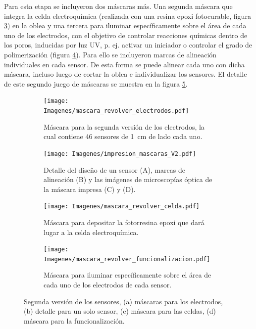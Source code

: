 {		     Para esta etapa se incluyeron dos máscaras más. Una segunda máscara que integra la celda electroquímica (realizada con una resina epoxi fotocurable, figura \ref{fig:mascara_su8}) en la oblea y una tercera para iluminar específicamente sobre el área de cada uno de los electrodos, con el objetivo de controlar reacciones químicas dentro de los poros, inducidas por luz UV, p. ej. activar un iniciador o controlar el grado de polimerización  (figura \ref{fig:mascara_funcionalizacion}).\cite{Andrieu-Brunsen2015,Herzog2015,Silies2015} Para ello se incluyeron marcas de alineación individuales en cada sensor. De esta forma se puede alinear cada uno con dicha máscara, incluso luego de cortar la oblea e individualizar los sensores. El detalle de este segundo juego de máscaras se muestra en la figura \ref{fig:impresion_diseno_V2}.
					\begin{figure}[th!]
			 	   	    \centering
			 	   	    \begin{subfigure}[t]{0.495\textwidth}
			        	\texttt{[image: Imagenes/mascara\_revolver\_electrodos.pdf]}
			       		\caption{Máscara para la segunda versión de los electrodos, la cual contiene 46 sensores de \SI{1}{cm} de lado cada uno.}
			         	\label{fig:mascara_v2}
			     		\end{subfigure}
			     		\begin{subfigure}[t]{0.495\textwidth}
			     		\texttt{[image: Imagenes/impresion\_mascaras\_V2.pdf]}
			    		\caption{Detalle del diseño de un sensor (A), marcas de alineación (B) y las imágenes de microscopías óptica de la máscara impresa (C) y (D).}
			    		\label{fig:impresion_diseno_v2_b}	
						\end{subfigure}
			     		\begin{subfigure}[t]{0.495\textwidth}
			         	\texttt{[image: Imagenes/mascara\_revolver\_celda.pdf]}
			        	\caption{Máscara para depositar la fotorresina epoxi que dará lugar a la celda electroquímica.}
			         	\label{fig:mascara_su8}
			     		\end{subfigure}
						\begin{subfigure}[t]{0.495\textwidth}
			     		\texttt{[image: Imagenes/mascara\_revolver\_funcionalizacion.pdf]}
			        	\caption{Máscara para iluminar específicamente sobre el área de cada uno de los electrodos de cada sensor.}
			         	\label{fig:mascara_funcionalizacion}
			     		\end{subfigure}
			     		\caption[Juego de máscara. Segunda versión]{Segunda versión de los sensores, (a) máscaras  para los electrodos, (b) detalle para un solo sensor, (c) máscara para las celdas, (d) máscara para la funcionalización.}
			     		\label{fig:impresion_diseno_V2}
			     	   	\end{figure}
	
}

